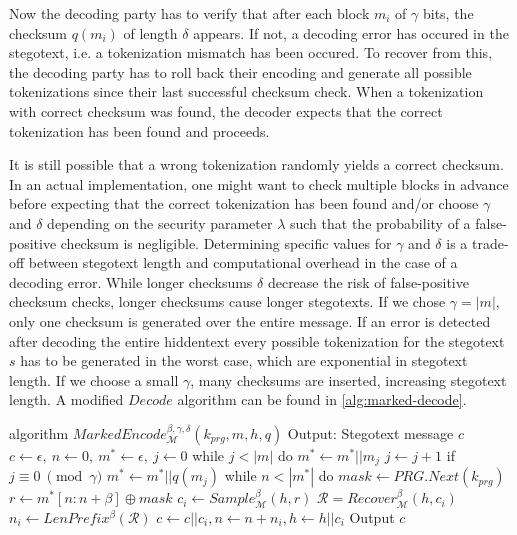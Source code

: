 Now the decoding party has to verify that after each block $m_i$ of $\gamma$ bits, the checksum $q(m_i)$ of length $\delta$ appears.
If not, a decoding error has occured in the stegotext, i.e. a tokenization mismatch has been occured.
To recover from this, the decoding party has to roll back their encoding and generate all possible tokenizations since their last successful checksum check.
When a tokenization with correct checksum was found, the decoder expects that the correct tokenization has been found and proceeds.

It is still possible that a wrong tokenization randomly yields a correct checksum.
In an actual implementation, one might want to check multiple blocks in advance before expecting that the correct tokenization has been found and/or choose $\gamma$ and $\delta$ depending on the security parameter $\lambda$ such that the probability of a false-positive checksum is negligible.
Determining specific values for $\gamma$ and $\delta$ is a trade-off between stegotext length and computational overhead in the case of a decoding error.
While longer checksums $\delta$ decrease the risk of false-positive checksum checks, longer checksums cause longer stegotexts.
If we chose $\gamma = |m|$, only one checksum is generated over the entire message. 
If an error is detected after decoding the entire hiddentext every possible tokenization for the stegotext $s$ has to be generated in the worst case, which are exponential in stegotext length.
If we choose a small $\gamma$, many checksums are inserted, increasing stegotext length.
A modified $Decode$ algorithm can be found in \autoref{alg:marked-decode}.

\begin{Pseudocode}[caption={
$MarkedEncode$ Algorithm.
The modification this algorithm introduces is that after every $\gamma$ bits a checksum $q(m_i)$ is inserted into the hiddentext.
This allows the recipient to check for decoding errors due to wrong tokenization.
$q$ is a function $q \colon \{0,1\}^\gamma \rightarrow \{0,1\}^\delta$ which generates a checksum of length $\delta$ for a message block of length $\gamma$.
}, label={alg:marked-encode}]
algorithm $MarkedEncode_{\mathcal{M}}^{\beta, \gamma, \delta}(k_{prg}, m, h, q)$
	Output: Stegotext message $c$
	$c \leftarrow \epsilon,~ n \leftarrow 0,~ m^* \leftarrow \epsilon,~ j \leftarrow 0$
	while $j < |m|$ do
		$m^* \leftarrow m^* || m_j$
		$j \leftarrow j + 1$
		if $j \equiv 0~ \pmod \gamma$
			$m^* \leftarrow m^* || q(m_j)$
	while $n < |m^*|$ do
		$mask \leftarrow PRG.Next(k_{prg})$
		$r \leftarrow m^*[n:n+\beta] \oplus mask$
		$c_i \leftarrow Sample_{\mathcal{M}}^\beta(h, r)$
		$\mathcal{R} = Recover_{\mathcal{M}}^\beta(h, c_i)$
		$n_i \leftarrow LenPrefix^\beta(\mathcal{R})$
		$c \leftarrow c || c_i, n \leftarrow n+n_i, h \leftarrow h||c_i$
	Output $c$
\end{Pseudocode}



